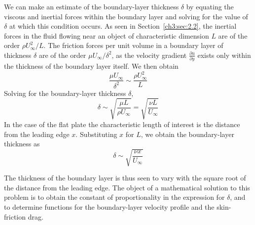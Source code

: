 We can make an estimate of the boundary-layer thickness $\delta$ by equating
the viscous and inertial forces within the boundary layer and solving for the
value of $\delta$ at which this condition occurs. As seen in
Section~\ref{ch3:sec:2.2}, the inertial forces in the fluid flowing near an
object of characteristic dimension $L$ are of the order $\rho U_\infty^2/L$.
The friction forces per unit volume in a boundary layer of thickness $\delta$
are of the order $\mu U_\infty/\delta^2$, as the velocity gradient
$\frac{\partial u}{\partial y}$ exists only within the thickness of the
boundary layer itself. We then obtain
\begin{equation}\label{ch3:eq:35}
\frac{\mu U_\infty}{\delta^2} \sim \frac{\rho U_\infty^2}{L}
\end{equation}
Solving for the boundary-layer thickness $\delta$,
\begin{equation}\label{ch3:eq:36}
\delta \sim \sqrt{\frac{\mu L}{\rho U_\infty}} = \sqrt{\frac{\nu L}{U_\infty}}
\end{equation}
In the case of the flat plate the characteristic length of interest is the
distance from the leading edge $x$. Substituting $x$ for $L$, we obtain the
boundary-layer thickness as
\begin{equation}\label{ch3:eq:37}
\delta \sim \sqrt{\frac{\nu x}{U_\infty}}
\end{equation}

The thickness of the boundary layer is thus seen to vary with the square root
of the distance from the leading edge. The object of a mathematical solution
to this problem is to obtain the constant of proportionality in the expression
for $\delta$, and to determine functions for the boundary-layer velocity
profile and the skin-friction drag.

